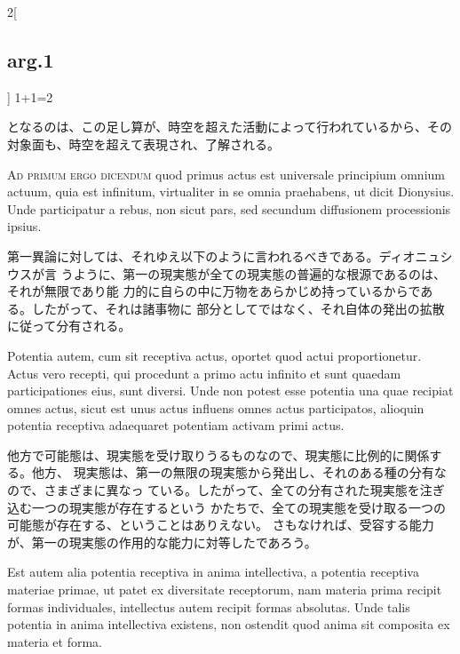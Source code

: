 \documentclass[paper=a4paper,fontsize=10pt,jafontsize=9pt,titlepage]{jlreq}
\begin{document}
\begin{paracol}{2}[\subsection{arg.1}]
 1+1=2

 となるのは、この足し算が、時空を超えた活動によって行われているから、その対象面も、時空を超えて表現され、了解される。
 
 \fi
 

\switchcolumn*[\subsection{ad 1}]

{\scshape Ad primum ergo dicendum} quod primus actus est universale principium
omnium actuum, quia est infinitum, virtualiter in se omnia praehabens, ut dicit
Dionysius. Unde participatur a rebus, non sicut pars, sed secundum diffusionem
processionis ipsius.

\switchcolumn

第一異論に対しては、それゆえ以下のように言われるべきである。ディオニュシウスが言
うように、第一の現実態が全ての現実態の普遍的な根源であるのは、それが無限であり能
力的に自らの中に万物をあらかじめ持っているからである。したがって、それは諸事物に
部分としてではなく、それ自体の発出の拡散に従って分有される。

\switchcolumn*

Potentia autem, cum sit receptiva actus, oportet quod actui proportionetur.
Actus vero recepti, qui procedunt a primo actu infinito et sunt quaedam
participationes eius, sunt diversi. Unde non potest esse potentia una quae
recipiat omnes actus, sicut est unus actus influens omnes actus participatos,
alioquin potentia receptiva adaequaret potentiam activam primi actus.

\switchcolumn

他方で可能態は、現実態を受け取りうるものなので、現実態に比例的に関係する。他方、
現実態は、第一の無限の現実態から発出し、それのある種の分有なので、さまざまに異なっ
ている。したがって、全ての分有された現実態を注ぎ込む一つの現実態が存在するという
かたちで、全ての現実態を受け取る一つの可能態が存在する、ということはありえない。
さもなければ、受容する能力が、第一の現実態の作用的な能力に対等したであろう。

\switchcolumn*

Est autem alia potentia receptiva in anima intellectiva, a potentia receptiva
materiae primae, ut patet ex diversitate receptorum, nam materia prima recipit
formas individuales, intellectus autem recipit formas absolutas. Unde talis
potentia in anima intellectiva existens, non ostendit quod anima sit composita
ex materia et forma.

\switchcolumn


\end{paracol}
\end{document}
